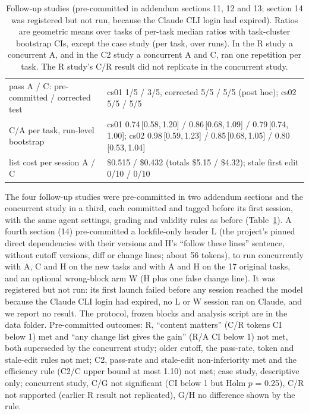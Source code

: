 \documentclass[11pt]{article}
\newcommand{\ci}[2]{\,[#1,\,#2]}
\begin{document}
\begin{table}[t]
\begin{tabular}{>{\raggedright\arraybackslash}p{5.0cm}>{\raggedright\arraybackslash}p{10.0cm}}
pass A / C: pre-committed / corrected test & cs01 1/5 / 3/5, corrected 5/5 / 5/5 (post hoc); cs02 5/5 / 5/5 \\
C/A per task, run-level bootstrap & cs01 0.74\ci{0.58}{1.20} / 0.86\ci{0.68}{1.09} / 0.79\ci{0.74}{1.00}; cs02 0.98\ci{0.59}{1.23} / 0.85\ci{0.68}{1.05} / 0.80\ci{0.53}{1.04} \\
list cost per session A / C & \$0.515 / \$0.432 (totals \$5.15 / \$4.32); stale first edit 0/10 / 0/10 \\
\bottomrule
\end{tabular}
\caption{Follow-up studies (pre-committed in addendum sections 11, 12 and 13; section 14 was registered but not run, because the Claude CLI login had expired). Ratios are geometric means over tasks of per-task median ratios with task-cluster bootstrap CIs, except the case study (per task, over runs). In the R study a concurrent A, and in the C2 study a concurrent A and C, ran one repetition per task. The R study's C/R result did not replicate in the concurrent study.}
\label{tab:followup}
\end{table}

The four follow-up studies were pre-committed in two addendum sections and the concurrent study in a third, each committed and tagged before its first session, with the same agent settings, grading and validity rules as before (Table~\ref{tab:followup}).
A fourth section (14) pre-committed a lockfile-only header L (the project's pinned direct dependencies with their versions and H's ``follow these lines'' sentence, without cutoff versions, diff or change lines; about 56 tokens), to run concurrently with A, C and H on the new tasks and with A and H on the 17 original tasks, and an optional wrong-block arm W (H plus one false change line). It was registered but not run: its first launch failed before any session reached the model because the Claude CLI login had expired, no L or W session ran on Claude, and we report no result. The protocol, frozen blocks and analysis script are in the data folder.
Pre-committed outcomes: R, ``content matters'' (C/R tokens CI below 1) met and ``any change list gives the gain'' (R/A CI below 1) not met, both superseded by the concurrent study; older cutoff, the pass-rate, token and stale-edit rules not met; C2, pass-rate and stale-edit non-inferiority met and the efficiency rule (C2/C upper bound at most 1.10) not met; case study, descriptive only; concurrent study, C/G not significant (CI below 1 but Holm $p$ = 0.25), C/R not supported (earlier R result not replicated), G/H no difference shown by the rule.
\end{document}
